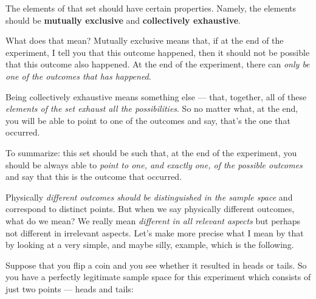 \documentclass[pdftex, brazil, 12pt, twoside]{article}
\begin{document}
The elements of that set should have certain
properties. Namely, the elements should be \textbf{mutually exclusive} and
\textbf{collectively exhaustive}.

\begin{figure}[H]
  \begin{center}
  \end{center}
\end{figure}

What does that mean?
Mutually exclusive means that, if at the end of the
experiment, I tell you that this outcome happened, then it
should not be possible that this outcome also happened.
At the end of the experiment, there can \emph{only be one of the
outcomes that has happened}.

Being collectively exhaustive means something else --- that,
together, all of these \emph{elements of the set exhaust
all the possibilities}.
So no matter what, at the end, you will be able to point to
one of the outcomes and say, that's the one that occurred.

To summarize:
this set should be such that, at the end of the experiment,
you should be always able to \emph{point to one, and exactly one,
of the possible outcomes} and say that this is the outcome
that occurred.

Physically \emph{different outcomes should be distinguished in the
sample space} and correspond to distinct points.
But when we say physically different
outcomes, what do we mean?
We really mean \emph{different in all relevant aspects} but
perhaps not different in irrelevant aspects.
Let's make more precise what I mean by that by looking at a
very simple, and maybe silly, example,
which is the following.

Suppose that you flip a coin and you see whether it
resulted in heads or tails.
So you have a perfectly legitimate sample space for
this experiment which consists of just two points ---
heads and tails:

\begin{figure}[H]
  \begin{center}
  \end{center}
\end{figure}
\end{document}
